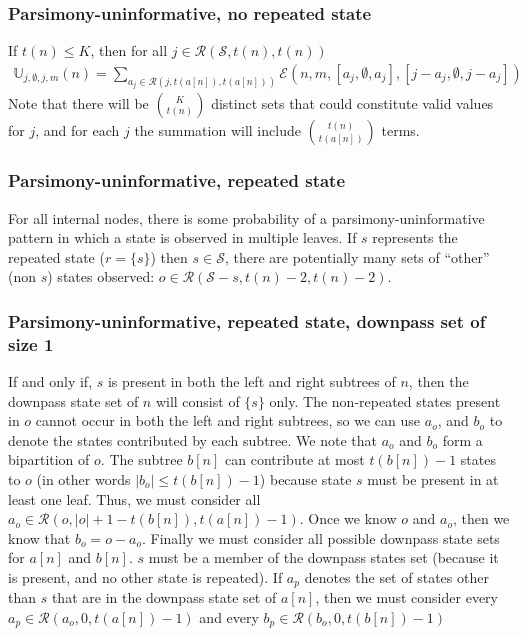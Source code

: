 \documentclass[11pt]{article}
\newcommand{\numStates}{\ensuremath{K}\xspace}
\newcommand{\allStates}{\ensuremath{\mathcal S}\xspace}
\newcommand{\probUninformPatClassSym}{\ensuremath{\mathbb U}\xspace}
\newcommand{\probUninformPatClass}[5]{\ensuremath{\probUninformPatClassSym_{#1,#2,#3,#4}\left(#5\right)}\xspace}
\newcommand{\leftChild}[1]{\ensuremath{a\left[#1\right]}\xspace} %
\newcommand{\rightChild}[1]{\ensuremath{b\left[#1\right]}\xspace}%
\newcommand{\numLeaves}[1]{\ensuremath{t\left(#1\right)}\xspace}
\newcommand{\subsetsOfSizeSet}[3]{\ensuremath{\mathcal R}\left(#1,#2,#3\right)\xspace}
\newcommand{\DoubleFelsensteinPruneSym}{{\mathcal{E}}}
\newcommand{\DoubleFelsensteinPruneUninform}[8]{\DoubleFelsensteinPruneSym(#1,#2,\left[#3,#4,#5\right],\left[#6,#7,#8\right])}
\begin{document}
\subsubsection{Parsimony-uninformative, no repeated state}
If $\numLeaves{n}\leq\numStates$, then for all $j\in\subsetsOfSizeSet{\allStates}{\numLeaves{n}}{\numLeaves{n}}$
\begin{eqnarray}
\probUninformPatClass{j}{\emptyset}{j}{m}{n}= \sum_{a_j\in\subsetsOfSizeSet{j}{\numLeaves{\leftChild{n}}}{\numLeaves{\leftChild{n}}}}\DoubleFelsensteinPruneUninform{n}{m}{a_j}{\emptyset}{a_j}{j-a_j}{\emptyset}{j-a_j}
\end{eqnarray}
Note that there will be $\numStates\choose\numLeaves{n}$ distinct sets that could constitute valid values for $j$, and for each $j$ the summation will include $\numLeaves{n}\choose\numLeaves{\leftChild{n}}$ terms.



\subsubsection{Parsimony-uninformative, repeated state}
For all internal nodes, there is some probability of a parsimony-uninformative pattern in which a state is observed in multiple leaves.
If $s$ represents the repeated state ($r=\{s\}$) then $s\in \allStates$, there are potentially many sets of ``other'' (non $s$) states observed: $o\in\subsetsOfSizeSet{\allStates-s}{\numLeaves{n}-2}{\numLeaves{n}-2}$.


\subsubsection{Parsimony-uninformative, repeated state, downpass set of size 1}
If and only if, $s$ is present in both the left and right subtrees of $n$, then the downpass state set of $n$ will consist of $\{s\}$ only.
The non-repeated states present in $o$ cannot occur in both the left and right subtrees, so we can use $a_o$, and $b_o$ to denote the states contributed by each subtree. We note that $a_o$ and $b_o$ form a bipartition of $o$.
The subtree $\rightChild{n}$ can contribute at most $\numLeaves{\rightChild{n}}-1$ states to $o$ (in other words $|b_o| \leq \numLeaves{\rightChild{n}}-1$) because state $s$ must be present in at least one leaf.
Thus, we must consider all $a_o\in\subsetsOfSizeSet{o}{|o| +1 - \numLeaves{\rightChild{n}} }{\numLeaves{\leftChild{n}}-1}$.
Once we know $o$ and $a_o$, then we know that $b_o = o - a_o$.
Finally we must consider all possible downpass state sets for $\leftChild{n}$ and $\rightChild{n}$.
$s$ must be a member of the downpass states set (because it is present, and no other state is repeated).
If $a_{p}$ denotes the set of states other than $s$ that are in the downpass state set of $\leftChild{n}$, then we must consider every 
$a_p\in\subsetsOfSizeSet{a_o}{0}{\numLeaves{\leftChild{n}}-1}$ and every $b_p\in\subsetsOfSizeSet{b_o}{0}{\numLeaves{\rightChild{n}}-1}$
\end{document}
